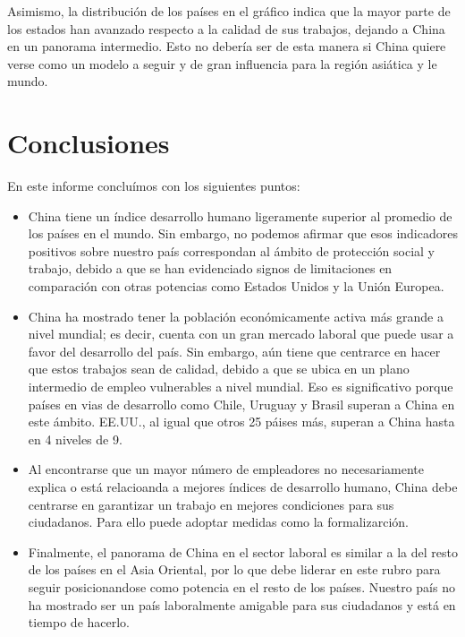 \documentclass[
]{article}
\begin{document}
Asimismo, la distribución de los países en el gráfico indica que la
mayor parte de los estados han avanzado respecto a la calidad de sus
trabajos, dejando a China en un panorama intermedio. Esto no debería ser
de esta manera si China quiere verse como un modelo a seguir y de gran
influencia para la región asiática y le mundo.

\hypertarget{conclusiones}{%
\section{Conclusiones}\label{conclusiones}}

En este informe concluímos con los siguientes puntos:

\begin{itemize}
\item
  China tiene un índice desarrollo humano ligeramente superior al
  promedio de los países en el mundo. Sin embargo, no podemos afirmar
  que esos indicadores positivos sobre nuestro país correspondan al
  ámbito de protección social y trabajo, debido a que se han evidenciado
  signos de limitaciones en comparación con otras potencias como Estados
  Unidos y la Unión Europea.
\item
  China ha mostrado tener la población económicamente activa más grande
  a nivel mundial; es decir, cuenta con un gran mercado laboral que
  puede usar a favor del desarrollo del país. Sin embargo, aún tiene que
  centrarce en hacer que estos trabajos sean de calidad, debido a que se
  ubica en un plano intermedio de empleo vulnerables a nivel mundial.
  Eso es significativo porque países en vias de desarrollo como Chile,
  Uruguay y Brasil superan a China en este ámbito. EE.UU., al igual que
  otros 25 páises más, superan a China hasta en 4 niveles de 9.
\item
  Al encontrarse que un mayor número de empleadores no necesariamente
  explica o está relacioanda a mejores índices de desarrollo humano,
  China debe centrarse en garantizar un trabajo en mejores condiciones
  para sus ciudadanos. Para ello puede adoptar medidas como la
  formalizarción.
\item
  Finalmente, el panorama de China en el sector laboral es similar a la
  del resto de los países en el Asia Oriental, por lo que debe liderar
  en este rubro para seguir posicionandose como potencia en el resto de
  los países. Nuestro país no ha mostrado ser un país laboralmente
  amigable para sus ciudadanos y está en tiempo de hacerlo.
\end{itemize}
\end{document}

